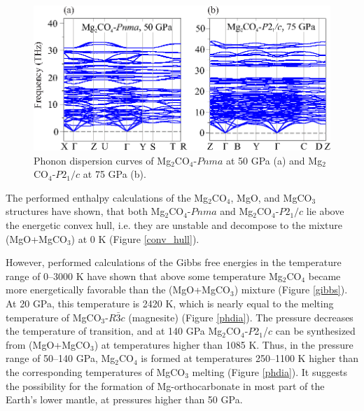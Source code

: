 \documentclass[a4paperm]{article}
\begin{document}
\begin{figure}[h]
	\includegraphics[width=\textwidth]{phon_mg} \centering
	\caption{Phonon dispersion curves of Mg$_2$CO$_4$-$Pnma$ at 50 GPa (a) and Mg$_2$CO$_4$-$P2_1/c$ at 75 GPa (b).} 	\label{phon_mg2co4_main}
\end{figure}

The performed enthalpy calculations of the Mg$_2$CO$_4$, MgO, and MgCO$_3$ structures have shown, that both Mg$_2$CO$_4$-$Pnma$ and Mg$_2$CO$_4$-$P2_1/c$ lie above the energetic convex hull, i.e. they are unstable and decompose to the mixture (MgO+MgCO$_3$) at 0 K (Figure \ref{conv_hull}). 

However, performed calculations of the Gibbs free energies in the temperature range of 0--3000 K have shown that above some temperature  Mg$_2$CO$_4$ became more energetically favorable than the (MgO+MgCO$_3$) mixture (Figure \ref{gibbs}).
At 20 GPa, this temperature is 2420 K, which is nearly equal to the melting temperature of MgCO$_3$-$R\bar{3}c$ (magnesite) \cite{solopova2015} (Figure \ref{phdia}).
The pressure decreases the temperature of transition, and at 140 GPa Mg$_2$CO$_4$-$P$2$_1$/$c$ can be synthesized from (MgO+MgCO$_3$) at temperatures higher than 1085 K.
Thus, in the pressure range of 50--140 GPa, Mg$_2$CO$_4$ is formed at temperatures 250--1100 K higher than the corresponding temperatures of MgCO$_3$ melting (Figure \ref{phdia}). 
It suggests the possibility for the formation of Mg-orthocarbonate in most part of the Earth's lower mantle, at pressures higher than 50 GPa.
\end{document}
